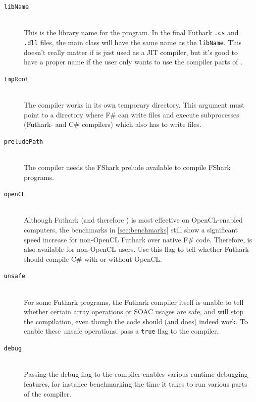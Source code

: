 \begin{description}
\item[\texttt{libName}]\hfill\\
  This is the library name for the \fshark{} program. In the final Futhark
  \texttt{.cs} and \texttt{.dll} files, the main class will have the same name
  as the \texttt{libName}. This doesn't really matter if \fshark{} is just used
  as a JIT compiler, but it's good to have a proper name if the user only wants
  to use the compiler parts of \fshark{}.

\item[\texttt{tmpRoot}]\hfill\\
  The \fshark{} compiler works in its own temporary directory. This argument must
  point to a directory where F\# can write files and execute subprocesses
  (Futhark- and C\# compilers) which also has to write files.
  
\item[\texttt{preludePath}]\hfill\\
  The \fshark{} compiler needs the FShark prelude available to compile FShark
  programs. 

\item[\texttt{openCL}]\hfill\\
  Although Futhark (and therefore \fshark{}) is most effective on OpenCL-enabled
  computers, the benchmarks in \ref{sec:benchmarks} still show a significant
  speed increase for non-OpenCL Futhark over native F\# code.
  Therefore, \fshark{} is also available for non-OpenCL users. Use this flag to
  tell \fshark{} whether Futhark should compile C\# with or without OpenCL.
  
\item[\texttt{unsafe}]\hfill\\
  For some Futhark programs, the Futhark compiler itself is unable to tell
  whether certain array operations or SOAC usages are safe, and will stop the
  compilation, even though the code should (and does) indeed work.
  To enable these unsafe operations, pass a \texttt{true} flag to the compiler.

\item[\texttt{debug}]\hfill\\
  Passing the debug flag to the \fshark{} compiler enables various runtime
  debugging features, for instance benchmarking the time it takes to run various
  parts of the compiler.
\end{description}

